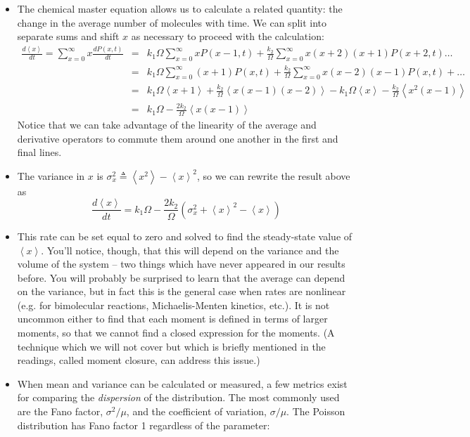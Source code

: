 \documentclass{article}
\begin{document}
\begin{itemize}
\item The chemical master equation allows us to calculate a related quantity: the change in the average number of molecules with time. We can split into separate sums and shift $x$ as necessary to proceed with the calculation:
\begin{eqnarray*}
\frac{d \left< x \right>}{dt} = \sum_{x=0}^{\infty} x \frac{dP(x,t)}{dt} & = & k_1 \Omega \sum_{x=0}^{\infty} x P(x-1,t) + \frac{k_2}{\Omega} \sum_{x=0}^{\infty} x(x+2)(x+1)P(x+2,t)  \ldots\\
& = & k_1 \Omega \sum_{x=0}^{\infty} (x+1)P(x,t) + \frac{k_2}{\Omega} \sum_{x=0}^{\infty} x(x-2)(x-1)P(x,t)  + \ldots\\
& = & k_1 \Omega \left< x + 1\right> + \frac{k_2}{\Omega} \left< x(x-1)(x-2) \right> - k_1 \Omega \left< x \right> - \frac{k_2}{\Omega} \left< x^2(x-1) \right> \\
& = & k_1 \Omega  -\frac{2 k_2}{\Omega} \left< x(x-1) \right>
\end{eqnarray*}
Notice that we can take advantage of the linearity of the average and derivative operators to commute them around one another in the first and final lines.
\item The variance in $x$ is $\sigma_x^2 \triangleq \left< x^2 \right> - \left< x \right>^2$, so we can rewrite the result above as
\[ \frac{d \left< x \right>}{dt} = k_1 \Omega - \frac{2 k_2}{\Omega} \left( \sigma_x^2  + \left< x \right>^2 - \left< x \right> \right) \]
\item This rate can be set equal to zero and solved to find the steady-state value of $\left< x \right>$. You'll notice, though, that this will depend on the variance and the volume of the system -- two things which have never appeared in our results before. You will probably be surprised to learn that the average can depend on the variance, but in fact this is the general case when rates are nonlinear (e.g. for bimolecular reactions, Michaelis-Menten kinetics, etc.). It is not uncommon either to find that each moment is defined in terms of larger moments, so that we cannot find a closed expression for the moments. (A technique which we will not cover but which is briefly mentioned in the readings, called moment closure, can address this issue.)
\item When mean and variance can be calculated or measured, a few metrics exist for comparing the \textit{dispersion} of the distribution. The most commonly used are the Fano factor, $\sigma^2/\mu$, and the coefficient of variation, $\sigma/\mu$. The Poisson distribution has Fano factor 1 regardless of the parameter:

\end{itemize}
\end{document}
